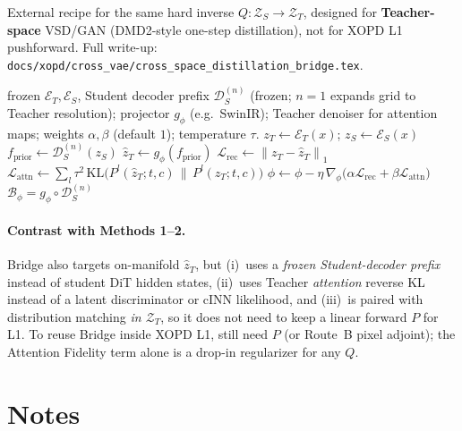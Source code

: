 \documentclass[11pt,a4paper]{article}
\newcommand{\Za}{\mathcal{Z}_{T}}
\newcommand{\Zb}{\mathcal{Z}_{S}}
\newcommand{\Enc}{\mathcal{E}}
\newcommand{\Dec}{\mathcal{D}}
\newcommand{\norm}[1]{\left\lVert #1 \right\rVert}
\newcommand{\zT}{z_{T}}
\newcommand{\zS}{z_{S}}
\newcommand{\Bridge}{\mathcal{B}}
\begin{document}
External recipe for the same hard inverse $Q:\Zb\!\to\!\Za$, designed for
\textbf{Teacher-space} VSD/GAN (DMD2-style one-step distillation), not for XOPD L1
pushforward. Full write-up:
\texttt{docs/xopd/cross\_vae/cross\_space\_distillation\_bridge.tex}.

\begin{algorithm}[ht]
\caption{Cross-Space Bridge --- offline training (summary)}
\label{alg:bridge}
\begin{algorithmic}[1]
\Require frozen $\Enc_T,\Enc_S$, Student decoder prefix $\Dec_S^{(n)}$ (frozen; $n{=}1$ expands
         grid to Teacher resolution); projector $g_\phi$ (e.g.\ SwinIR); Teacher denoiser for
         attention maps; weights $\alpha,\beta$ (default $1$); temperature $\tau$.
  \State $\zT \gets \Enc_T(x)$; \quad $\zS \gets \Enc_S(x)$
  \State $f_{\mathrm{prior}} \gets \Dec_S^{(n)}(\zS)$
  \State $\hat\zT \gets g_\phi(f_{\mathrm{prior}})$
  \State $\mathcal{L}_{\mathrm{rec}} \gets \norm{\zT-\hat\zT}_1$
  \State $\mathcal{L}_{\mathrm{attn}} \gets \sum_l \tau^2\,\mathrm{KL}\big(
         P^l(\hat\zT;t,c)\,\|\,P^l(\zT;t,c)\big)$
  \State $\phi \gets \phi - \eta\,\nabla_\phi\big(
         \alpha\mathcal{L}_{\mathrm{rec}}+\beta\mathcal{L}_{\mathrm{attn}}\big)$
\EndFor
\State \Return $\Bridge_\phi = g_\phi\circ\Dec_S^{(n)}$
\end{algorithmic}
\end{algorithm}

\paragraph{Contrast with Methods 1--2.}
Bridge also targets on-manifold $\hat\zT$, but (i)~uses a \emph{frozen Student-decoder
prefix} instead of student DiT hidden states, (ii)~uses Teacher \emph{attention} reverse KL
instead of a latent discriminator or cINN likelihood, and (iii)~is paired with
distribution matching \emph{in $\Za$}, so it does not need to keep a linear forward $P$
for L1. To reuse Bridge inside XOPD L1, still need $P$ (or Route~B pixel adjoint); the
Attention Fidelity term alone is a drop-in regularizer for any $Q$.

\section{Notes}
\label{sec:notes}
\end{document}
